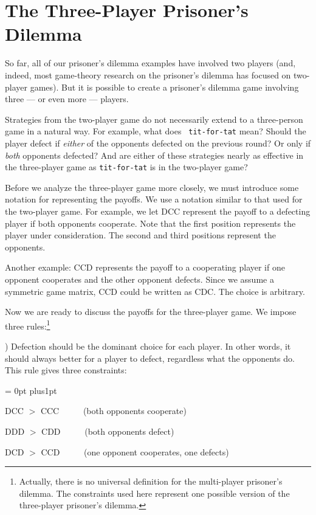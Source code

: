\section{The Three-Player Prisoner's Dilemma}

So far, all of our prisoner's dilemma examples have involved two
players (and, indeed, most game-theory research on the prisoner's
dilemma has focused on two-player games). But it is possible to create
a prisoner's dilemma game involving three --- or even more ---
players.

Strategies from the two-player game do not necessarily extend to a
three-person game in a natural way. For example, what does {\tt
tit-for-tat} mean? Should the player defect if {\it either} of the
opponents defected on the previous round? Or only if {\it both}
opponents defected? And are either of these strategies nearly as
effective in the three-player game as {\tt tit-for-tat} is in the
two-player game?

Before we analyze the three-player game more closely, we must
introduce some notation for representing the payoffs. We use a
notation similar to that used for the two-player game. For example, we
let DCC represent the payoff to a defecting player if both opponents
cooperate. Note that the first position represents the player under
consideration. The second and third positions represent the opponents.

Another example: CCD represents the payoff to a cooperating player if
one opponent cooperates and the other opponent defects.  Since we
assume a symmetric game matrix, CCD could be written as CDC. The
choice is arbitrary.

Now we are ready to discuss the payoffs for the three-player game. We
impose three rules:\footnote*{Actually, there is no universal
definition for the multi-player prisoner's dilemma. The constraints
used here represent one possible version of the three-player
prisoner's dilemma.}

) Defection should be the dominant choice for each player.
In other words, it should always better for a player to defect,
regardless what the opponents do. This rule gives three constraints:

{\narrower \narrower
{\parskip = 0pt plus1pt

	DCC $>$ CCC  \ \ \ \ \ (both opponents cooperate)

	DDD $>$ CDD  \ \ \ \ \ (both opponents defect)

	DCD $>$ CCD  \ \ \ \ \ (one opponent cooperates, one defects)

}}


